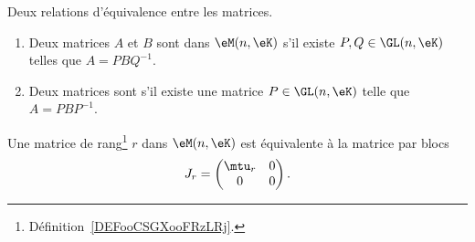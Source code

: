 \begin{definition}  \label{DefBLELooTvlHoB}
    Deux relations d'équivalence entre les matrices.
    \begin{enumerate}
        \item   \label{ItemPFXCooOUbSCt}
    Deux matrices \( A\) et \( B\) sont  dans \( \eM(n,\eK)\) s'il existe \( P,Q\in\GL(n,\eK)\) telles que \( A=PBQ^{-1}\).
\item
    Deux matrices sont  s'il existe une matrice \( P\in \GL(n,\eK)\) telle que \( A=PBP^{-1}\).
    \end{enumerate}
\end{definition}

\begin{lemma}   \label{LemZMxxnfM}
    Une matrice de rang\footnote{Définition~\ref{DEFooCSGXooFRzLRj}.} \( r\) dans \( \eM(n,\eK)\) est équivalente à la matrice par blocs
    \begin{equation}
        J_r=\begin{pmatrix}
            \mtu_r    &   0    \\
            0    &   0
        \end{pmatrix}.
    \end{equation}
\end{lemma}

